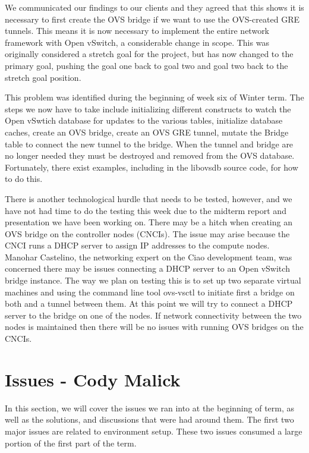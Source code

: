 \documentclass[10pt,onecolumn,journal,draftclsnofoot]{IEEEtran}
\begin{document}
We communicated our findings to our clients and they agreed that this shows it
is necessary to first create the OVS bridge if we want to use the OVS-created
GRE tunnels. This means it is now necessary to implement the entire network
framework with Open vSwitch, a considerable change in scope. This was originally
considered a stretch goal for the project, but has now changed to the primary
goal, pushing the goal one back to goal two and goal two back to the stretch
goal position.

This problem was identified during the beginning of week six of Winter term. The
steps we now have to take include initializing different constructs to watch the
Open vSwtich database for updates to the various tables, initialize database
caches, create an OVS bridge, create an OVS GRE tunnel, mutate the Bridge table
to connect the new tunnel to the bridge. When the tunnel and bridge are no
longer needed they must be destroyed and removed from the OVS database.
Fortunately, there exist examples, including in the libovsdb source code, for
how to do this.

There is another technological hurdle that needs to be tested, however, and we
have not had time to do the testing this week due to the midterm report and
presentation we have been working on. There may be a hitch when creating an OVS
bridge on the controller nodes (CNCIs). The issue may arise because the CNCI
runs a DHCP server to assign IP addresses to the compute nodes. Manohar
Castelino, the networking expert on the Ciao development team, was concerned
there may be issues connecting a DHCP server to an Open vSwitch bridge instance.
The way we plan on testing this is to set up two separate virtual machines and
using the command line tool ovs-vsctl to initiate first a bridge on both and a
tunnel between them. At this point we will try to connect a DHCP server to the
bridge on one of the nodes. If network connectivity between the two nodes is
maintained then there will be no issues with running OVS bridges on the CNCIs.

\section{Issues - Cody Malick}
In this section, we will cover the issues we ran into at the beginning of term,
as well as the solutions, and discussions that were had around them. The first
two major issues are related to environment setup. These two issues consumed a
large portion of the first part of the term.
\end{document}
